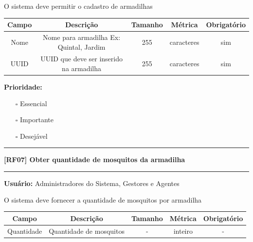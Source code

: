 	O sistema deve permitir o cadastro de armadilhas
	
	\begin{center}
		\begin{adjustbox}{width=\textwidth}      \begin{tabular}{ |c|c|c|c|c| } 
			\hline
			\rowcolor{lightgray} Campo & Descrição & Tamanho & Métrica & Obrigatório \\
			\hline
			Nome & Nome para armadilha Ex: Quintal, Jardim & 255 & caracteres & sim \\ 
			\hline  
			UUID & UUID que deve ser inserido na armadilha & 255 & caracteres & sim \\ 
			\hline  
		\end{tabular}    \end{adjustbox}
	\end{center}
	
	\textbf{Prioridade: }\begin{itemize}
		\item[\hspace{1cm}\rlap{\raisebox{0.2ex}{\hspace{0.4ex}\scriptsize \ding{56}}}$\square$]
		Essencial
		\item[\hspace{1cm}$\square$]
		Importante
		\item[\hspace{1cm}$\square$]
		Desejável
	\end{itemize}
	\begin{center}
		\noindent\rule{\textwidth}{0.4pt}
		\textbf{[RF07] Obter quantidade de mosquitos da armadilha}
		\noindent\rule{\textwidth}{0.4pt}
	\end{center}
	\textbf{Usuário:} Administradores do Sistema, Gestores e Agentes
	
	O sistema deve fornecer a quantidade de mosquitos por armadilha
	
	\begin{center}
		\begin{adjustbox}{width=\textwidth}      \begin{tabular}{ |c|c|c|c|c| } 
			\hline
			\rowcolor{lightgray} Campo & Descrição & Tamanho & Métrica & Obrigatório \\
			\hline
			Quantidade & Quantidade de mosquitos & - & inteiro & - \\    
			\hline 
		\end{tabular}    \end{adjustbox}
	\end{center}
	
